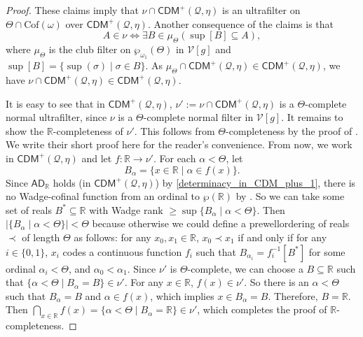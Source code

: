 \documentclass{amsart}
\renewcommand{\subset}{\subseteq}
\newcommand{\power}{\wp}
\begin{document}
\begin{proof}
    These claims imply that $\nu\cap\mathsf{CDM}^+(\mathcal{Q}, \eta)$ is an ultrafilter on $\Theta\cap\mathrm{Cof}(\omega)$ over $\mathsf{CDM}^+(\mathcal{Q}, \eta)$.
    Another consequence of the claims is that
    \[
    A\in\nu\iff\exists B\in\mu_{\Theta}(\sup[B]\subset A),
    \]
    where $\mu_{\Theta}$ is the club filter on $\power_{\omega_1}(\Theta)$ in $\mathcal{V}[g]$ and $\sup[B]=\{\sup(\sigma)\mid\sigma\in B\}$.
    As $\mu_{\Theta}\cap\mathsf{CDM}^+(\mathcal{Q}, \eta)\in\mathsf{CDM}^+(\mathcal{Q}, \eta)$, we have $\nu\cap\mathsf{CDM}^+(\mathcal{Q}, \eta)\in\mathsf{CDM}^+(\mathcal{Q}, \eta)$.
    
    It is easy to see that in $\mathsf{CDM}^+(\mathcal{Q}, \eta)$, $\nu':=\nu\cap\mathsf{CDM}^+(\mathcal{Q}, \eta)$ is a $\Theta$-complete normal ultrafilter, since $\nu$ is a $\Theta$-complete normal filter in $\mathcal{V}[g]$.
    It remains to show the $\mathbb{R}$-completeness of $\nu'$.
    This follows from $\Theta$-completeness by the proof of \cite[Theorem 2.6]{PmaxSquare}.
    We write their short proof here for the reader's convenience.
    From now, we work in $\mathsf{CDM}^+(\mathcal{Q}, \eta)$ and let $f\colon\mathbb{R}\to\nu'$.
    For each $\alpha<\Theta$, let 
    \[
    B_{\alpha}=\{x\in\mathbb{R}\mid\alpha\in f(x)\}.
    \]
    Since $\mathsf{AD}_{\mathbb{R}}$ holds (in $\mathsf{CDM}^+(\mathcal{Q}, \eta)$) by \cref{determinacy_in_CDM_plus_1}, there is no Wadge-cofinal function from an ordinal to $\power(\mathbb{R})$ by \cite[Remark 2.5]{PmaxSquare}.
    So we can take some set of reals $B^*\subset\mathbb{R}$ with Wadge rank $\geq\sup\{B_{\alpha}\mid\alpha<\Theta\}$.
    Then $\lvert\{B_{\alpha}\mid\alpha<\Theta\}\rvert<\Theta$ because otherwise we could define a prewellordering of reals $\prec$ of length $\Theta$ as follows: for any $x_0, x_1\in\mathbb{R}$, $x_0\prec x_1$ if and only if for any $i\in\{0, 1\}$, $x_i$ codes a continuous function $f_i$ such that $B_{\alpha_i}=f_i^{-1}[B^*]$ for some ordinal $\alpha_i<\Theta$, and $\alpha_0<\alpha_1$.
    Since $\nu'$ is $\Theta$-complete, we can choose a $B\subset\mathbb{R}$ such that $\{\alpha<\Theta\mid B_{\alpha}=B\}\in\nu'$.
    For any $x\in\mathbb{R}$, $f(x)\in\nu'$.
    So there is an $\alpha<\Theta$ such that $B_{\alpha}=B$ and $\alpha\in f(x)$, which implies $x\in B_{\alpha}=B$.
    Therefore, $B=\mathbb{R}$.
    Then $\bigcap_{x\in\mathbb{R}}f(x)=\{\alpha<\Theta\mid B_{\alpha}=\mathbb{R}\}\in\nu'$, which completes the proof of $\mathbb{R}$-completeness.
\end{proof}
\end{document}
